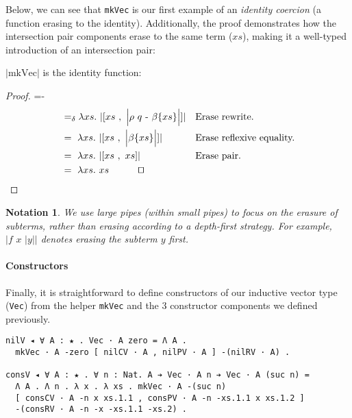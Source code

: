 \documentclass[a4paper,envcountsame,envcountsect]{llncs}
\newtheorem{notation}{Notation}
\newcommand{\eqed}[0]{\tag*{\qed}}
\newcommand{\lablem}[1]{\label{lem:#1}}
\newcommand{\nega}[0]{\ensuremath{{\text -}}}
\newcommand{\earg}[1]{\,\,#1}
\newcommand{\erase}[1]{\ensuremath{\lvert #1 \rvert}}
\newcommand{\Erase}[1]{\ensuremath{\Big\lvert #1 \Big\rvert}}
\newcommand{\rewrite}[2]{\ensuremath{\rho ~ #1 ~\nega~ #2}}
\newcommand{\pair}[2]{\ensuremath{[ #1 ~,~ #2]}}
\newcommand{\refl}[1]{\ensuremath{\beta\{#1\}}}
\newcommand{\fun}[1]{\lambda #1 .~}
\newcommand{\by}[1]{\text{#1}}
\newcommand{\name}[1]{\textrm{#1}}
\begin{document}
Below, we can see that \texttt{mkVec} is our first example of an
\textit{identity coercion} (a function erasing to the
identity). Additionally, the proof demonstrates how the intersection
pair components erase to the same term ($xs$), making it a well-typed
introduction of an intersection pair:

\begin{lemma}
\erase{\name{mkVec}} is the identity function:
\lablem{mkvec}
\end{lemma}

\begin{proof}
{\small
\abovedisplayskip=-\baselineskip
\begin{align*}
  &=_\delta \fun{xs} \erase{
    \pair{xs}{ \Erase{ \rewrite{q}{\refl{xs}} } }
  }
  && \by{Erase rewrite.}
  \\
  &=~ \fun{xs} \erase{
    \pair{xs}{ \Erase{\refl{xs}} }
  }
  && \by{Erase reflexive equality.}
  \\
  &=~ \fun{xs} \erase{
    \pair{xs}{xs}
  }
  && \by{Erase pair.}
  \\
  &=~ \fun{xs}{xs}
  \eqed
\end{align*}}
\end{proof}

\begin{notation}
  We use large pipes (within small pipes) to focus on the erasure of
  subterms, rather than erasing according to
  a depth-first strategy. For example, \erase{f \earg x \earg \Erase{y}}
  denotes erasing the subterm $y$ first.
\end{notation}

\paragraph{Constructors}

Finally, it is straightforward to define constructors of our inductive
vector type (\texttt{Vec}) from the helper \texttt{mkVec} and the 3
constructor components we defined previously.

\begin{verbatim}
nilV ◂ ∀ A : ★ . Vec · A zero = Λ A .
  mkVec · A -zero [ nilCV · A , nilPV · A ] -(nilRV · A) .

consV ◂ ∀ A : ★ . ∀ n : Nat. A ➔ Vec · A n ➔ Vec · A (suc n) =
  Λ A . Λ n . λ x . λ xs . mkVec · A -(suc n)
  [ consCV · A -n x xs.1.1 , consPV · A -n -xs.1.1 x xs.1.2 ]
  -(consRV · A -n -x -xs.1.1 -xs.2) .
\end{verbatim}
\end{document}
